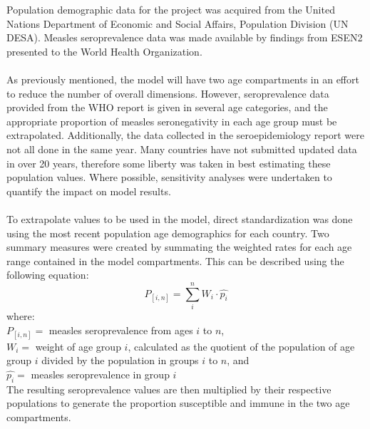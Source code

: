 \documentclass[../Paper.tex]{subfiles}
\begin{document}
Population demographic data for the project was acquired from the United Nations
Department of Economic and Social Affairs, Population Division (UN DESA). Measles
seroprevalence data was made available by findings from ESEN2 presented to the World
Health Organization.\\
\\
As previously mentioned, the model will have two age compartments in an effort to
reduce the number of overall dimensions. However, seroprevalence data provided from
the WHO report is given in several age categories, and the appropriate proportion
of measles seronegativity in each age group must be extrapolated. Additionally, the
data collected in the seroepidemiology report were not all done in the same year.
Many countries have not submitted updated data in over 20 years, therefore some
liberty was taken in best estimating these population values. Where possible, 
sensitivity analyses were undertaken to quantify the impact on model results.\\
\\
To extrapolate values to be used in the model, direct standardization was
done using the most recent population age demographics for each country. Two
summary measures were created by summating the weighted rates for each age range
contained in the model compartments. This can be described using the following
equation:\\
  \begin{equation}
    P_{[i,n]} =\sum_{i}^{n}W_{i}\cdot \widehat{p_{i}}
  \end{equation}
  where:\\
  $P_{[i,n]} =$ measles seroprevalence from ages $i$ to $n$, \\
  $W_{i} =$ weight of age group $i$, calculated as the quotient of the population
  of age group $i$ divided by the population in groups $i$ to $n$, and \\
  $\widehat{p_{i}} =$ measles seroprevalence in group $i$ \\
The resulting seroprevalence values are then multiplied by their respective
populations to generate the proportion susceptible and immune in the two age
compartments.
\clearpage
\end{document}
